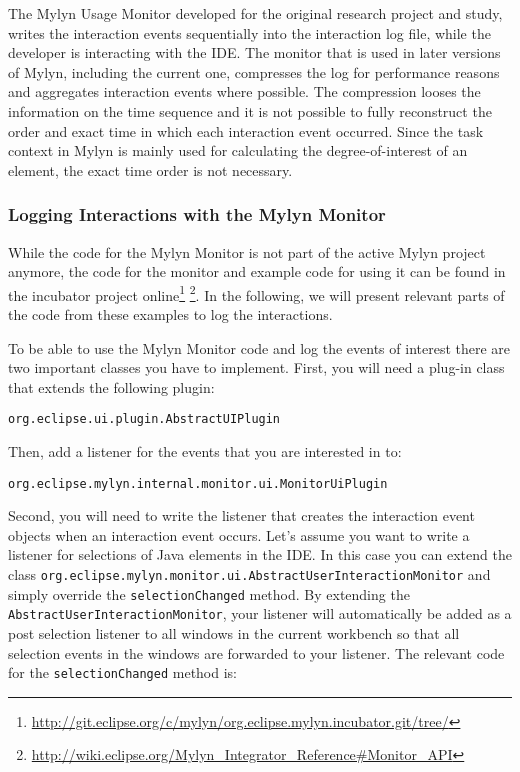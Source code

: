 The Mylyn Usage Monitor developed for the original research project and study, writes the interaction events sequentially into the interaction log file, while the developer is interacting with the IDE. The monitor that is used in later versions of Mylyn, including the current one, compresses the log for performance reasons and aggregates interaction events where possible. The compression looses the information on the time sequence and it is not possible to fully reconstruct the order and exact time in which each interaction event occurred. Since the task context in Mylyn is mainly used for calculating the degree-of-interest of an element, the exact time order is not necessary.


\subsubsection{Logging Interactions with the Mylyn Monitor}
	While the code for the Mylyn Monitor is not part of the active Mylyn project anymore, the code for the monitor and example code for using it can be found in the incubator project online\footnote{\url{http://git.eclipse.org/c/mylyn/org.eclipse.mylyn.incubator.git/tree/}} \footnote{\url{http://wiki.eclipse.org/Mylyn_Integrator_Reference\#Monitor_API}}. In the following, we will present relevant parts of the code from these examples to log the interactions.

To be able to use the Mylyn Monitor code and log the events of interest there are two important classes you have to implement. First, you will need a plug-in class that extends 
the following plugin: 

\begin{lstlisting}
org.eclipse.ui.plugin.AbstractUIPlugin
\end{lstlisting}

\noindent
Then, add a listener for the events that you are interested in to:

\begin{lstlisting}
org.eclipse.mylyn.internal.monitor.ui.MonitorUiPlugin 
\end{lstlisting}

Second, you will need to write the listener that creates the interaction event objects when an interaction event occurs. Let's assume you want to write a listener for selections of Java elements in the IDE. In this case you can extend the class \texttt{org.eclipse.mylyn.monitor.ui.AbstractUserInteractionMonitor} and simply override the \texttt{selectionChanged} method. By extending the \texttt{AbstractUserInteractionMonitor}, your listener will automatically be added as a post selection listener to all windows in the current workbench so that all selection events in the windows are forwarded to your listener. The relevant code for the \texttt{selectionChanged} method is:


